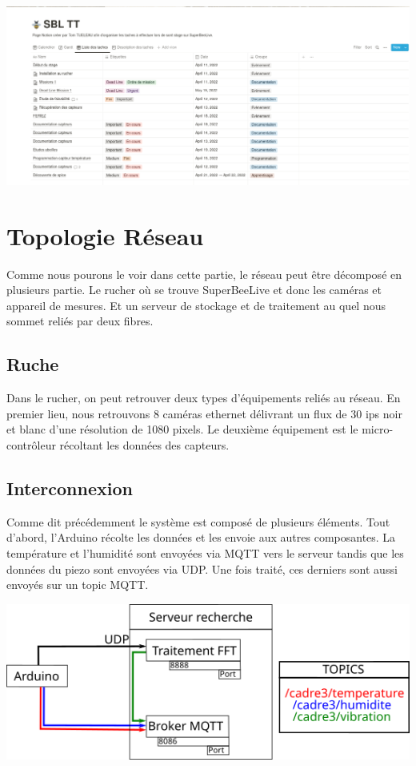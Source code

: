 \documentclass[12pt,french,a4paper]{article}
\begin{document}
\begin{center}	
\includegraphics[scale=0.35]{../img/notionlistesdestaches.png}
\label{Liste des taches}
\end{center}
\newpage

\section{Topologie Réseau}
Comme nous pourons le voir dans cette partie, le réseau peut être décomposé en plusieurs partie. Le rucher où se trouve SuperBeeLive et donc les caméras et appareil de mesures. Et un serveur de stockage et de traitement au quel nous sommet reliés par deux fibres. 
\subsection{Ruche}
Dans le rucher, on peut retrouver deux types d'équipements reliés au réseau. En premier lieu, nous retrouvons 8 caméras ethernet délivrant un flux de 30 ips noir et blanc d'une résolution de 1080 pixels. Le deuxième équipement est le micro-contrôleur récoltant les données des capteurs.  
\subsection{Interconnexion}
Comme dit précédemment le système est composé de plusieurs éléments. Tout d'abord, l'Arduino récolte les données et les envoie aux autres composantes. La température et l'humidité sont envoyées via MQTT vers le serveur tandis que les données du piezo sont envoyées via UDP. Une fois traité, ces derniers sont aussi envoyés sur un topic MQTT.

\begin{center}
    \includegraphics[scale=1]{../img/schemaNet.png}
    \label{SN}
\end{center}
\end{document}
